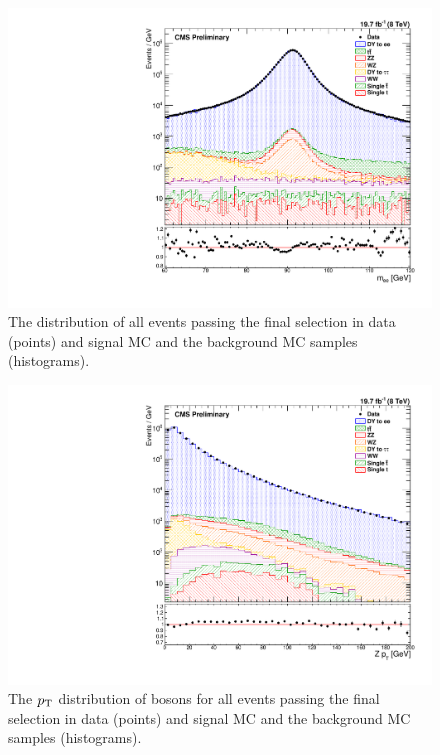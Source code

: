 \begin{figure}[!htbp]
    \centering
    \includegraphics[width=\textwidth]{figures/z_mass_fine_powheg.pdf}
    \caption[
        The \mee distribution of events in data and MC with \POWHEG signal MC.
    ]{
        The \mee distribution of all events passing the final selection in data
        (points) and \POWHEG signal MC and the background MC samples
        (histograms).
    }
    \label{fig:z_mass_powheg}
\end{figure}

\begin{figure}[!htbp]
    \centering
    \includegraphics[width=\textwidth]{figures/z_pt.pdf}
    \caption[
        The $\pt$ distribution of \Z bosons in data and MC with \MADGRAPH
        signal MC.
    ]{
        The $\pt$ distribution of \Z bosons for all events passing the final
        selection in data (points) and \MADGRAPH signal MC and the background
        MC samples (histograms).
    }
    \label{fig:z_pt}
\end{figure}


